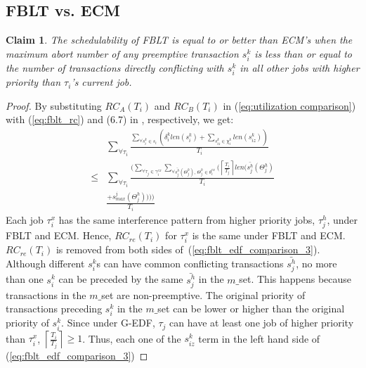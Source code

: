 \documentclass[conference]{IEEEtran}
\newtheorem{clm}{Claim}
\begin{document}
\subsection{FBLT vs. ECM}

\begin{clm}\label{clm:fblt_ecm}
The schedulability of FBLT is equal to or better than ECM's when the maximum abort number of any preemptive transaction $s_i^k$ is less than or equal to the number of transactions directly conflicting with $s_i^k$ in all other jobs with higher priority than $\tau_{i}$'s current job. 
\end{clm}
%
\begin{proof}

By substituting $RC_{A}(T_{i})$ and $RC_{B}(T_{i})$ in (\ref{eq:utilization comparison})
with (\ref{eq:fblt_rc}) and (6.7) in \cite{shambake_phd_proposal}, 
respectively, we get: 
%
\begin{eqnarray}
 & \sum_{\forall\tau_{i}}\frac{\sum_{\forall s_{i}^{k}\in s_{i}}\left(\delta_{i}^{k}len(s_{i}^{k})+\sum_{s_{iz}^k\in \chi_i^k} len(s_{iz}^{k})\right)}{T_{i}}\nonumber\\
\le & \sum_{\forall\tau_{i}}\frac{\Big(\sum_{\forall\tau_{j}\in\gamma_{i}^{ex}}\sum_{\forall \bar{s_{j}^{h}}(\Theta_j^h),\,\Theta_j^h\in\theta_{i}^{ex}}\Big(\left\lceil \frac{T_{i}}{T_{j}}\right\rceil len\Big(\bar{s_{j}^{h}}(\Theta_j^h)}{T_i}\nonumber\\
& \frac{+s_{max}^{j}(\Theta_j^h)\Big)\Big)\Big)}{T_{i}}\label{eq:fblt_edf_comparison_3} 
\end{eqnarray}
%
Each job $\tau_i^x$ has the same interference pattern from higher priority jobs, $\tau_j^h$, under FBLT and ECM. Hence, $RC_{re}(T_i)$ for $\tau_i^x$ is the same under FBLT and ECM. $RC_{re}(T_i)$ is removed from both sides of~(\ref{eq:fblt_edf_comparison_3}). Although different $s_{i}^{k}$s can have common conflicting transactions $\bar{s_{j}^{h}}$, no more than one $s_{i}^{k}$ can be preceded by the same $\bar{s_{j}^{h}}$ in the $m\_$set. This happens because transactions in the $m\_$set are non-preemptive. The original priority of transactions preceding $s_{i}^{k}$ in the $m\_$set can be lower or higher than the original priority of $s_{i}^{k}$. Since under G-EDF, $\tau_{j}$ can have at least one job of higher priority than $\tau_{i}^{x}$, $\left\lceil \frac{T_{i}}{T_{j}}\right\rceil \ge1$. Thus, each one of the $s_{iz}^{k}$ term in the left hand side of (\ref{eq:fblt_edf_comparison_3})

\end{proof}
\end{document}
